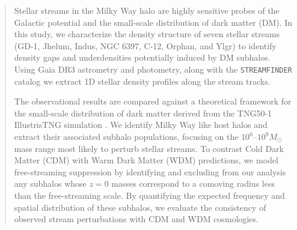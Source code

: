 \documentclass[10pt,onecolumn]{article}
\begin{document}
\maketitle
\begin{abstract}
      Stellar streams in the Milky Way halo are highly sensitive probes of the Galactic potential and the small-scale distribution of dark matter (DM). In this study, we characterize the density structure of seven stellar streams (GD-1, Jhelum, Indus, NGC 6397, C-12, Orphan, and Ylgr) to identify density gaps and underdensities potentially induced by DM subhalos. Using Gaia DR3 \citep{Vallenari2023} astrometry and photometry, along with the \texttt{STREAMFINDER} catalog \citep{Ibata2024, Malhan2018} we extract 1D stellar density profiles along the stream tracks.

      The observational results are compared against a theoretical framework for the small-scale distribution of dark matter derived from the TNG50-1 IllustrisTNG simulation \citep{Nelson2019}. We identify Milky Way like host halos and extract their associated subhalo populations, focusing on the $10^6$--$10^9 M_{\odot}$ mass range most likely to perturb stellar streams. To contrast Cold Dark Matter (CDM) with Warm Dark Matter (WDM) predictions, we model free-streaming suppression by identifying and excluding from our analysis any subhalos whose $z=0$ masses correspond to a comoving radius less than the free-streaming scale. By quantifying the expected frequency and spatial distribution of these subhalos, we evaluate the consistency of observed stream perturbations with CDM and WDM cosmologies.
    \end{abstract}
\end{document}
